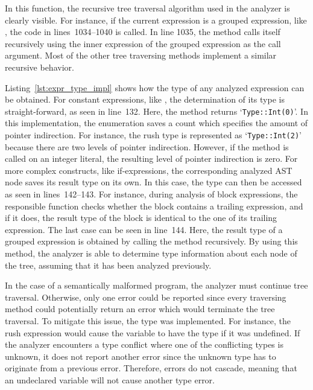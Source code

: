 In this function, the recursive tree traversal algorithm used in the analyzer is clearly visible.
For instance, if the current expression is a grouped expression, like , the code in lines~1034--1040 is called.
In line 1035, the  method calls itself recursively using the inner expression of the grouped expression as the call argument.
Most of the other tree traversing methods implement a similar recursive behavior.


Listing~\ref{lst:expr_type_impl} shows how the type of any analyzed expression can be obtained.
For constant expressions, like , the determination of its type is straight-forward, as seen in line~132.
Here, the  method returns `\verb|Type::Int(0)|'.
In this implementation, the  enumeration saves a count which specifies the amount of pointer indirection.
For instance, the rush type  is represented as `\verb|Type::Int(2)|' because there are two levels of pointer indirection.
However, if the method is called on an integer literal, the resulting level of pointer indirection is zero.
For more complex constructs, like if-expressions, the corresponding analyzed AST node saves its result type on its own.
In this case, the type can then be accessed as seen in lines~142--143.
For instance, during analysis of block expressions, the responsible function checks whether the block contains a trailing expression, and if it does, the result type of the block is identical to the one of its trailing expression.
The last case can be seen in line~144.
Here, the result type of a grouped expression is obtained by calling the  method recursively.
By using this method, the analyzer is able to determine type information about each node of the tree, assuming that it has been analyzed previously.

In the case of a semantically malformed program, the analyzer must continue tree traversal.
Otherwise, only one error could be reported since every traversing method could potentially return an error which would terminate the tree traversal.
To mitigate this issue, the  type was implemented.
For instance, the rush expression  would cause the  variable to have the  type if it was undefined.
If the analyzer encounters a type conflict where one of the conflicting types is unknown,
it does not report another error since the unknown type has to originate from a previous error.
Therefore, errors do not cascade, meaning that an undeclared variable will not cause another type error.

